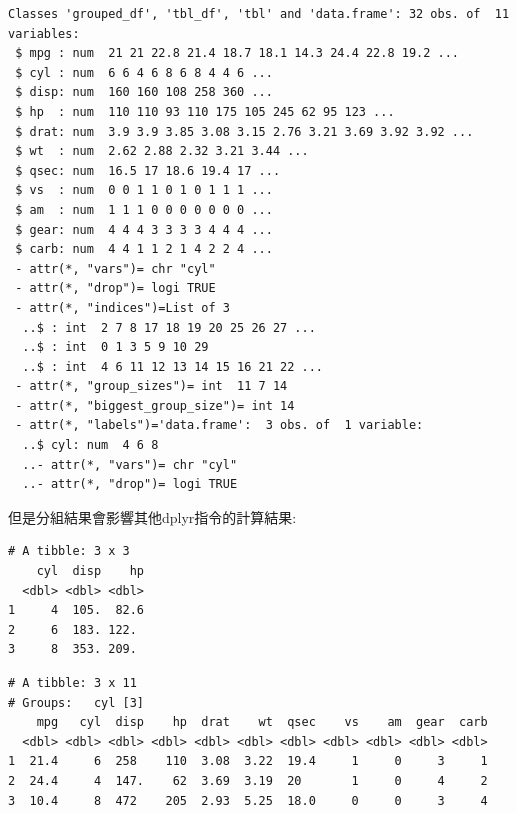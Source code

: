 \documentclass[]{book}
\newenvironment{Shaded}{\begin{snugshade}}{\end{snugshade}}
\newcommand{\DataTypeTok}[1]{\textcolor[rgb]{0.13,0.29,0.53}{#1}}
\newcommand{\KeywordTok}[1]{\textcolor[rgb]{0.13,0.29,0.53}{\textbf{#1}}}
\newcommand{\NormalTok}[1]{#1}
\newcommand{\OperatorTok}[1]{\textcolor[rgb]{0.81,0.36,0.00}{\textbf{#1}}}
\newcommand{\StringTok}[1]{\textcolor[rgb]{0.31,0.60,0.02}{#1}}
\theoremstyle{definition}
\theoremstyle{definition}
\theoremstyle{definition}
\theoremstyle{remark}
\begin{document}
\begin{verbatim}
Classes 'grouped_df', 'tbl_df', 'tbl' and 'data.frame': 32 obs. of  11 variables:
 $ mpg : num  21 21 22.8 21.4 18.7 18.1 14.3 24.4 22.8 19.2 ...
 $ cyl : num  6 6 4 6 8 6 8 4 4 6 ...
 $ disp: num  160 160 108 258 360 ...
 $ hp  : num  110 110 93 110 175 105 245 62 95 123 ...
 $ drat: num  3.9 3.9 3.85 3.08 3.15 2.76 3.21 3.69 3.92 3.92 ...
 $ wt  : num  2.62 2.88 2.32 3.21 3.44 ...
 $ qsec: num  16.5 17 18.6 19.4 17 ...
 $ vs  : num  0 0 1 1 0 1 0 1 1 1 ...
 $ am  : num  1 1 1 0 0 0 0 0 0 0 ...
 $ gear: num  4 4 4 3 3 3 3 4 4 4 ...
 $ carb: num  4 4 1 1 2 1 4 2 2 4 ...
 - attr(*, "vars")= chr "cyl"
 - attr(*, "drop")= logi TRUE
 - attr(*, "indices")=List of 3
  ..$ : int  2 7 8 17 18 19 20 25 26 27 ...
  ..$ : int  0 1 3 5 9 10 29
  ..$ : int  4 6 11 12 13 14 15 16 21 22 ...
 - attr(*, "group_sizes")= int  11 7 14
 - attr(*, "biggest_group_size")= int 14
 - attr(*, "labels")='data.frame':  3 obs. of  1 variable:
  ..$ cyl: num  4 6 8
  ..- attr(*, "vars")= chr "cyl"
  ..- attr(*, "drop")= logi TRUE
\end{verbatim}

但是分組結果會影響其他dplyr指令的計算結果:

\begin{Shaded}
\end{Shaded}

\begin{verbatim}
# A tibble: 3 x 3
    cyl  disp    hp
  <dbl> <dbl> <dbl>
1     4  105.  82.6
2     6  183. 122. 
3     8  353. 209. 
\end{verbatim}

\begin{Shaded}
\end{Shaded}

\begin{verbatim}
# A tibble: 3 x 11
# Groups:   cyl [3]
    mpg   cyl  disp    hp  drat    wt  qsec    vs    am  gear  carb
  <dbl> <dbl> <dbl> <dbl> <dbl> <dbl> <dbl> <dbl> <dbl> <dbl> <dbl>
1  21.4     6  258    110  3.08  3.22  19.4     1     0     3     1
2  24.4     4  147.    62  3.69  3.19  20       1     0     4     2
3  10.4     8  472    205  2.93  5.25  18.0     0     0     3     4
\end{verbatim}
\end{document}
